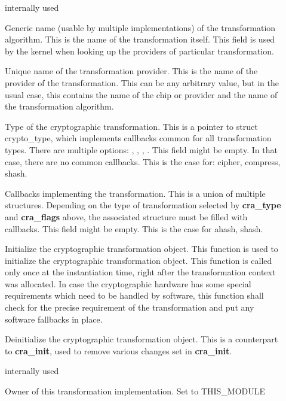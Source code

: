 \documentclass[a4paper,8pt,english]{sphinxmanual}
\begin{document}
\begin{description}
\item[{}] \leavevmode
internally used

\item[{}] \leavevmode
Generic name (usable by multiple implementations) of the
transformation algorithm. This is the name of the transformation
itself. This field is used by the kernel when looking up the
providers of particular transformation.

\item[{}] \leavevmode
Unique name of the transformation provider. This is the
name of the provider of the transformation. This can be any
arbitrary value, but in the usual case, this contains the
name of the chip or provider and the name of the
transformation algorithm.

\item[{}] \leavevmode
Type of the cryptographic transformation. This is a pointer to
struct crypto\_type, which implements callbacks common for all
transformation types. There are multiple options:
, ,
, .
This field might be empty. In that case, there are no common
callbacks. This is the case for: cipher, compress, shash.

\item[{}] \leavevmode
Callbacks implementing the transformation. This is a union of
multiple structures. Depending on the type of transformation selected
by \textbf{cra\_type} and \textbf{cra\_flags} above, the associated structure must be
filled with callbacks. This field might be empty. This is the case
for ahash, shash.

\item[{}] \leavevmode
Initialize the cryptographic transformation object. This function
is used to initialize the cryptographic transformation object.
This function is called only once at the instantiation time, right
after the transformation context was allocated. In case the
cryptographic hardware has some special requirements which need to
be handled by software, this function shall check for the precise
requirement of the transformation and put any software fallbacks
in place.

\item[{}] \leavevmode
Deinitialize the cryptographic transformation object. This is a
counterpart to \textbf{cra\_init}, used to remove various changes set in
\textbf{cra\_init}.

\item[{}] \leavevmode
internally used

\item[{}] \leavevmode
Owner of this transformation implementation. Set to THIS\_MODULE

\end{description}
\end{document}
